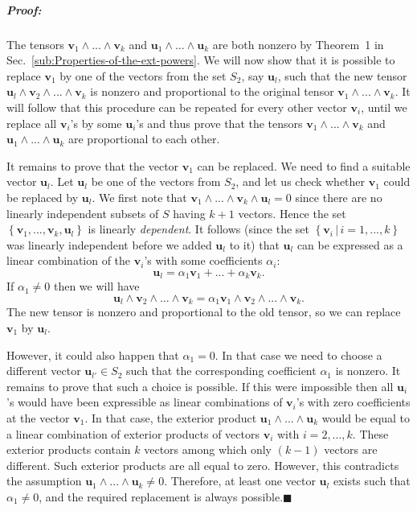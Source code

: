 \subparagraph{Proof:}

The tensors $\mathbf{v}_{1}\wedge...\wedge\mathbf{v}_{k}$ and $\mathbf{u}_{1}\wedge...\wedge\mathbf{u}_{k}$
are both nonzero by Theorem~1 in Sec.~\ref{sub:Properties-of-the-ext-powers}.
We will now show that it is possible to replace $\mathbf{v}_{1}$
by one of the vectors from the set $S_{2}$, say $\mathbf{u}_{l}$,
such that the new tensor $\mathbf{u}_{l}\wedge\mathbf{v}_{2}\wedge...\wedge\mathbf{v}_{k}$
is nonzero and proportional to the original tensor $\mathbf{v}_{1}\wedge...\wedge\mathbf{v}_{k}$.
It will follow that this procedure can be repeated for every other
vector $\mathbf{v}_{i}$, until we replace all $\mathbf{v}_{i}$'s
by some $\mathbf{u}_{i}$'s and thus prove that the tensors $\mathbf{v}_{1}\wedge...\wedge\mathbf{v}_{k}$
and $\mathbf{u}_{1}\wedge...\wedge\mathbf{u}_{k}$ are proportional
to each other.

It remains to prove that the vector $\mathbf{v}_{1}$ can be replaced.
We need to find a suitable vector $\mathbf{u}_{l}$. Let $\mathbf{u}_{l}$
be one of the vectors from $S_{2}$, and let us check whether $\mathbf{v}_{1}$
could be replaced by $\mathbf{u}_{l}$. We first note that $\mathbf{v}_{1}\wedge...\wedge\mathbf{v}_{k}\wedge\mathbf{u}_{l}=0$
since there are no linearly independent subsets of $S$ having $k+1$
vectors. Hence the set $\left\{ \mathbf{v}_{1},...,\mathbf{v}_{k},\mathbf{u}_{l}\right\} $
is linearly \emph{dependent}. It follows (since the set $\left\{ \mathbf{v}_{i}\,|\, i=1,...,k\right\} $
was linearly independent before we added $\mathbf{u}_{l}$ to it)
that $\mathbf{u}_{l}$ can be expressed as a linear combination of
the $\mathbf{v}_{i}$'s with some coefficients $\alpha_{i}$:\[
\mathbf{u}_{l}=\alpha_{1}\mathbf{v}_{1}+...+\alpha_{k}\mathbf{v}_{k}.\]
If $\alpha_{1}\neq0$ then we will have\[
\mathbf{u}_{l}\wedge\mathbf{v}_{2}\wedge...\wedge\mathbf{v}_{k}=\alpha_{1}\mathbf{v}_{1}\wedge\mathbf{v}_{2}\wedge...\wedge\mathbf{v}_{k}.\]
The new tensor is nonzero and proportional to the old tensor, so we
can replace $\mathbf{v}_{1}$ by $\mathbf{u}_{l}$. 

However, it could also happen that $\alpha_{1}=0$. In that case we
need to choose a different vector $\mathbf{u}_{l'}\in S_{2}$ such
that the corresponding coefficient $\alpha_{1}$ is nonzero. It remains
to prove that such a choice is possible. If this were impossible then
all $\mathbf{u}_{i}$'s would have been expressible as linear combinations
of $\mathbf{v}_{i}$'s with zero coefficients at the vector $\mathbf{v}_{1}$.
In that case, the exterior product $\mathbf{u}_{1}\wedge...\wedge\mathbf{u}_{k}$
would be equal to a linear combination of exterior products of vectors
$\mathbf{v}_{i}$ with $i=2,...,k$. These exterior products contain
$k$ vectors among which only $\left(k-1\right)$ vectors are different.
Such exterior products are all equal to zero. However, this contradicts
the assumption $\mathbf{u}_{1}\wedge...\wedge\mathbf{u}_{k}\neq0$.
Therefore, at least one vector $\mathbf{u}_{l}$ exists such that
$\alpha_{1}\neq0$, and the required replacement is always possible.\hfill{}$\blacksquare$



